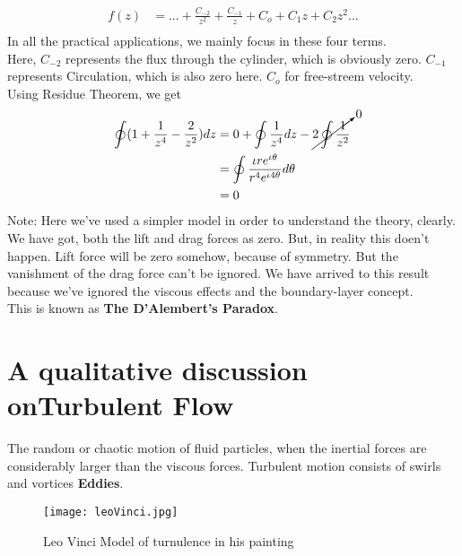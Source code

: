 \documentclass{book}
\begin{document}
\begin{equation*}
\begin{split}
f(z)&=...+\frac{C_{-2}}{z^2}+\frac{C_{-1}}{z}+C_o+C_1 z+C_2 z^2...\\
\end{split}
\end{equation*}
In all the practical applications, we mainly focus in these four terms. \\
Here, $C_{-2}$ represents the flux through the cylinder, which is obviously zero. $C_{-1}$ represents Circulation, which is also zero here. $C_o$ for free-streem velocity.\\
Using Residue Theorem, we get \textemdash
\begin{equation*}
\begin{split}
\oint(1+\frac{1}{z^4}-\frac{2}{z^2})dz&=0+\oint \frac{1}{z^4}dz-\cancelto{0}{2\oint\frac{1}{z^2}}\\
&=\oint \frac{\iota r e^{\iota \theta}}{r^4 e^{\iota 4 \theta}}d\theta\\
&=0\\
\end{split}
\end{equation*}
Note: Here we've used a simpler model in order to understand the theory, clearly.\\
We have got, both the lift and drag forces as zero. But, in reality this doen't happen. Lift force will be zero somehow, because of symmetry. But the vanishment of the drag force can't be ignored. We have arrived to this result because we've ignored the viscous effects and the boundary-layer concept.\\
This is known as \textbf{The D'Alembert's Paradox}.
\chapter{A qualitative discussion onTurbulent Flow}
The random or chaotic motion of fluid particles, when the inertial forces are considerably larger than the viscous forces. Turbulent motion consists of swirls and vortices \textemdash \textbf{Eddies}. \\

\begin{figure}[h]
 \texttt{[image: leoVinci.jpg]}
\caption{Leo Vinci Model of turnulence in his painting}
\end{figure}
\end{document}
